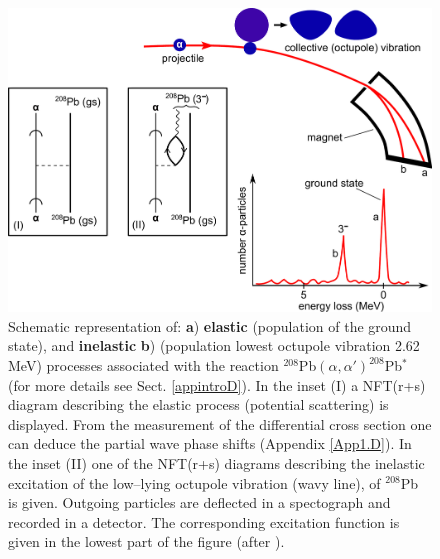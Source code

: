 \begin{figure}
\centerline {
\includegraphics*[width=15cm]{introduccion/figs/figintro1}
}
\caption{Schematic representation of: \textbf{a}) \textbf{elastic} (population of the ground state), and \textbf{inelastic} \textbf{b}) (population lowest octupole vibration 2.62 MeV) processes associated with the reaction $^{208}$Pb$(\alpha,\alpha')^{208}$Pb$^*$ (for more details see Sect. \ref{appintroD}). In the inset (I) a NFT(r+s) diagram describing  the elastic process (potential scattering) is displayed. From the measurement of the differential cross section one can deduce the partial wave phase shifts (Appendix \ref{App1.D}). In the inset (II) one of the NFT(r+s) diagrams describing the inelastic  excitation of the low--lying octupole vibration (wavy line), of $^{208}$Pb  is given.  Outgoing particles are deflected in a spectograph and recorded in a detector. The corresponding excitation function is given in the lowest part of the figure (after \cite{Mottelson:76b}).}
\label{figintro1}
\end{figure}
